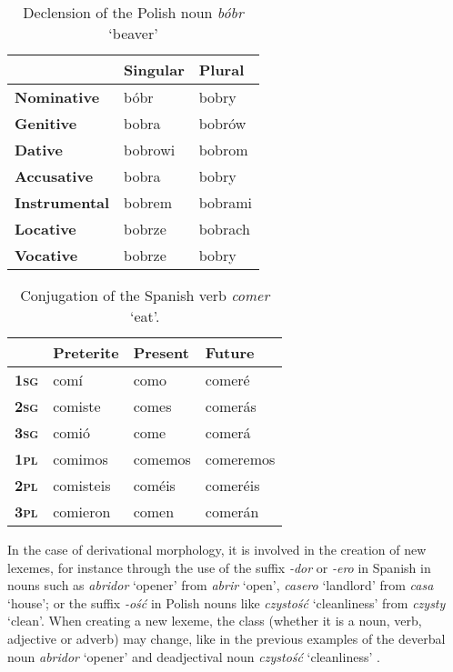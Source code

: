 \documentclass[12pt]{article}
\newcommand{\ita}[1]{\textit{#1}}
\begin{document}
\begin{table}[htbp]
    \centering
    \footnotesize
    \renewcommand{\arraystretch}{1.2} %
    \begin{tabular}{lll} 
        \toprule
        & \textbf{Singular} & \textbf{Plural} \\ 
        \midrule
        \textbf{Nominative}   & bóbr   & bobry \\
        \textbf{Genitive}     & bobra  & bobrów \\
        \textbf{Dative}       & bobrowi & bobrom \\
        \textbf{Accusative}    & bobra  & bobry \\
        \textbf{Instrumental} & bobrem & bobrami \\
        \textbf{Locative}     & bobrze & bobrach \\
        \textbf{Vocative}     & bobrze & bobry \\
        \bottomrule
    \end{tabular}
    \caption{Declension of the Polish noun \textit{bóbr} `beaver'}
    \label{tab:bobr}
\end{table}



\begin{table}[htbp]
    \centering
    \footnotesize
    \renewcommand{\arraystretch}{1.2} %
    \begin{tabular}{llll} 
        \toprule
        & \textbf{Preterite} & \textbf{Present} & \textbf{Future} \\ 
        \midrule
       \textbf{\textsc{1sg}}  & comí   & como   & comeré \\
       \textbf{\textsc{2sg}}  & comiste   & comes  & comerás \\
       \textbf{\textsc{3sg}}  & comió      & come & comerá \\
       \textbf{\textsc{1pl}}  & comimos    & comemos  & comeremos \\
       \textbf{\textsc{2pl}}  & comisteis  & coméis & comeréis \\
       \textbf{\textsc{3pl}}  & comieron     & comen & comerán \\
     \bottomrule
    \end{tabular}
    \caption{Conjugation of the Spanish verb \textit{comer} `eat'.}
    \label{tab:conjugation}
\end{table}

\noindent
In the case of derivational morphology, it is involved in the creation of new lexemes, for instance through the use of the suffix \ita{-dor} or \ita{-ero} in Spanish in nouns such as \ita{abridor} `opener' from \ita{abrir} `open', \ita{casero} `landlord' from \ita{casa} `house'; or the suffix \ita{-ość} in Polish nouns like \ita{czystość} `cleanliness' from \ita{czysty} `clean'. When creating a new lexeme, the class (whether it is a noun, verb, adjective or adverb) may change, like in the previous examples of the deverbal noun \ita{abridor} `opener' and deadjectival noun \ita{czystość} `cleanliness' \parencite{haspelmath2013UnderstandingMorphology,booij2012GrammarWordsIntroduction}.
\end{document}
